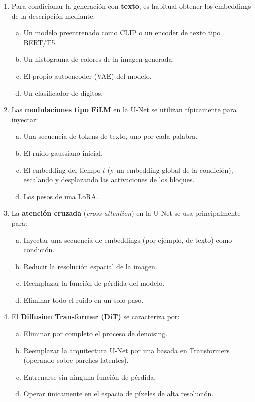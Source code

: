 \documentclass{article}
\begin{document}
\begin{enumerate}[{\bf 1.}]
	\item Para condicionar la generación con \textbf{texto}, es habitual obtener los embeddings de la descripción mediante:
	      \begin{enumerate}[(a)]
		      \item Un modelo preentrenado como CLIP o un encoder de texto tipo BERT/T5.
		      \item Un histograma de colores de la imagen generada.
		      \item El propio autoencoder (VAE) del modelo.
		      \item Un clasificador de dígitos.
	      \end{enumerate}

	\item Las \textbf{modulaciones tipo FiLM} en la U-Net se utilizan típicamente para inyectar:
	      \begin{enumerate}[(a)]
		      \item Una secuencia de tokens de texto, uno por cada palabra.
		      \item El ruido gaussiano inicial.
		      \item El embedding del tiempo $t$ (y un embedding global de la condición), escalando y desplazando las activaciones de los bloques.
		      \item Los pesos de una LoRA.
	      \end{enumerate}

	\item La \textbf{atención cruzada} (\textit{cross-attention}) en la U-Net se usa principalmente para:
	      \begin{enumerate}[(a)]
		      \item Inyectar una secuencia de embeddings (por ejemplo, de texto) como condición.
		      \item Reducir la resolución espacial de la imagen.
		      \item Reemplazar la función de pérdida del modelo.
		      \item Eliminar todo el ruido en un solo paso.
	      \end{enumerate}

	\item El \textbf{Diffusion Transformer (DiT)} se caracteriza por:
	      \begin{enumerate}[(a)]
		      \item Eliminar por completo el proceso de denoising.
		      \item Reemplazar la arquitectura U-Net por una basada en Transformers (operando sobre parches latentes).
		      \item Entrenarse sin ninguna función de pérdida.
		      \item Operar únicamente en el espacio de píxeles de alta resolución.
	      \end{enumerate}


\end{enumerate}
\end{document}
